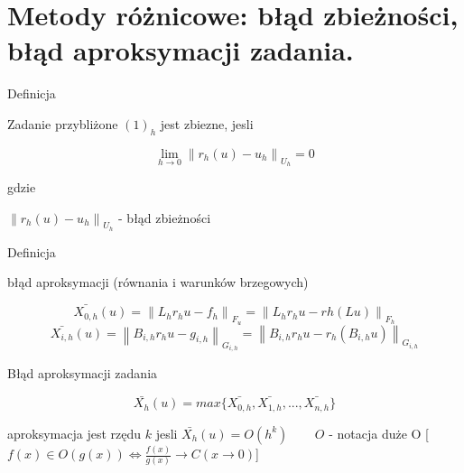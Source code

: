 \section{Metody różnicowe: błąd zbieżności, błąd aproksymacji zadania.}

Definicja

Zadanie przybliżone $(1)_h$ jest zbiezne, jesli

\[ \lim_{h \rightarrow 0} \left \| r_h(u) - u_h \right \|_{U_h} = 0 \]

gdzie

$\left \| r_h(u) - u_h \right \|_{U_h}$ - błąd zbieżności

Definicja

błąd aproksymacji (równania i warunków brzegowych)

\[ \bar{X_{0,h}} (u) = \left \| L_h r_h u - f_h \right \| _{F_u} = \left \| L_hr_hu - rh(Lu) \right \| _{F_h} \]
\[ \bar{X_{i,h}} (u) = \left \| B_{i,h} r_h u - g_{i,h} \right \|_{G_{i,h}} = \left \| B_{i,h} r_h u - r_h (B_{i,h} u) \right \| _{G_{i,h}} \]

Błąd aproksymacji zadania

\[ \bar{X_h} (u) = max \{ \bar{X_{0,h}}, \bar{X_{1,h}}, ..., \bar{X_{n,h}} \} \]

aproksymacja jest rzędu $k$ jesli $\bar{X_h} (u) = O(h^k)$ $\ \ \ \ \ \ \ \ O$ - notacja duże O [$ f(x) \in O(g(x)) \Leftrightarrow \frac{f(x)}{g(x)} \rightarrow C (x \rightarrow 0)$]



